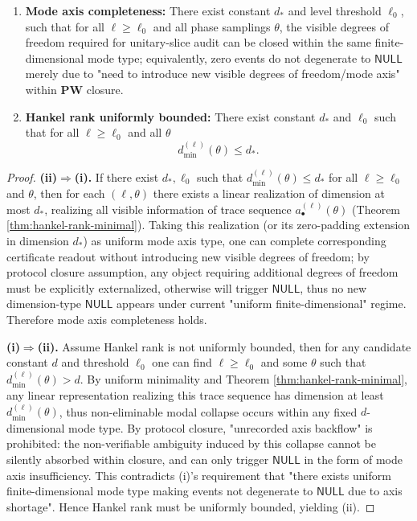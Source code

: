 \begin{theorem}
\begin{enumerate}
  \item[(i)] \textbf{Mode axis completeness:} There exist constant \(d_\ast\) and level threshold \(\ell_0\), such that for all \(\ell\ge \ell_0\) and all phase samplings \(\theta\), the visible degrees of freedom required for unitary-slice audit can be closed within the same finite-dimensional mode type; equivalently, zero events do not degenerate to \(\mathsf{NULL}\) merely due to "need to introduce new visible degrees of freedom/mode axis" within \(\mathbf{PW}\) closure.
  \item[(ii)] \textbf{Hankel rank uniformly bounded:} There exist constant \(d_\ast\) and \(\ell_0\) such that for all \(\ell\ge \ell_0\) and all \(\theta\)
  \[
  d^{(\ell)}_{\min}(\theta)\le d_\ast.
  \]
\end{enumerate}
\end{theorem}

\begin{proof}
\textbf{(ii)\(\Rightarrow\)(i).}
If there exist \(d_\ast,\ell_0\) such that \(d^{(\ell)}_{\min}(\theta)\le d_\ast\) for all \(\ell\ge\ell_0\) and \(\theta\), then for each \((\ell,\theta)\) there exists a linear realization of dimension at most \(d_\ast\), realizing all visible information of trace sequence \(a^{(\ell)}_\bullet(\theta)\) (Theorem \ref{thm:hankel-rank-minimal}).
Taking this realization (or its zero-padding extension in dimension \(d_\ast\)) as uniform mode axis type, one can complete corresponding certificate readout without introducing new visible degrees of freedom; by protocol closure assumption, any object requiring additional degrees of freedom must be explicitly externalized, otherwise will trigger \(\mathsf{NULL}\), thus no new dimension-type \(\mathsf{NULL}\) appears under current "uniform finite-dimensional" regime.
Therefore mode axis completeness holds.
\par
\textbf{(i)\(\Rightarrow\)(ii).}
Assume Hankel rank is not uniformly bounded, then for any candidate constant \(d\) and threshold \(\ell_0\) one can find \(\ell\ge\ell_0\) and some \(\theta\) such that
\(
d^{(\ell)}_{\min}(\theta)>\!d
\).
By uniform minimality and Theorem \ref{thm:hankel-rank-minimal}, any linear representation realizing this trace sequence has dimension at least \(d^{(\ell)}_{\min}(\theta)\), thus non-eliminable modal collapse occurs within any fixed \(d\)-dimensional mode type.
By protocol closure, "unrecorded axis backflow" is prohibited: the non-verifiable ambiguity induced by this collapse cannot be silently absorbed within closure, and can only trigger \(\mathsf{NULL}\) in the form of mode axis insufficiency.
This contradicts (i)'s requirement that "there exists uniform finite-dimensional mode type making events not degenerate to \(\mathsf{NULL}\) due to axis shortage".
Hence Hankel rank must be uniformly bounded, yielding (ii).
\end{proof}

